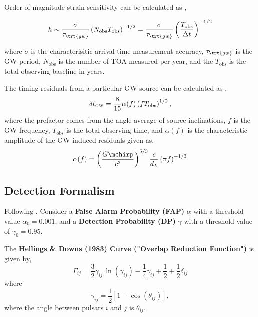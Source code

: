 \documentclass[10pt, oneside, onecolumn]{article}   	%
\newcommand{\tgw}{\tau_\trt{gw}}
\begin{document}
        Order of magnitude strain sensitivity can be calculated as \citep[][Eq.~21]{rajagopal1995},

        \begin{equation}
        h \sim \frac{\sigma}{\tgw} \left( N_\mathrm{obs} T_\mathrm{obs} \right)^{-1/2} = \frac{\sigma}{\tgw} \left( \frac{T_\mathrm{obs}}{\Delta t} \right)^{-1/2}
        \end{equation}

        where $\sigma$ is the characterisitic arrival time measurement accuracy, $\tgw$ is the GW period, $N_\mathrm{obs}$ is the number of TOA measured per-year, and the $T_\mathrm{obs}$ is the total observing baseline in years.

        The timing residuals from a particular GW source can be calculated as \citep[][Eq.~20]{sesana2009},
        \begin{equation}
        \delta t_\textrm{\tiny GW} = \frac{8}{15} \alpha(f) \left(f T_\textrm{obs}\right)^{1/2},
        \end{equation}
        where the prefactor comes from the angle average of source inclinations, $f$ is the GW frequency, $T_\textrm{obs}$ is the total observing time, and $\alpha(f)$ is the characteristic amplitude of the GW induced residuals given as,
        \begin{equation}
        \alpha(f) = \left(\frac{G \mchirp}{c^3}\right)^{5/3} \frac{c}{d_L} \left( \pi f \right)^{-1/3}
        \end{equation}

        \subsection{Detection Formalism}
        Following \citep{rosado2015}.  Consider a \textbf{False Alarm Probability (FAP)} $\alpha$ with a threshold value $\alpha_0 = 0.001$, and a \textbf{Detection Probability (DP)} $\gamma$ with a threshold value of $\gamma_0 = 0.95$.

        The \textbf{Hellings \& Downs (1983) Curve ("Overlap Reduction Function")} is given by,
        \begin{equation}
        \Gamma_{ij} = \frac{3}{2} \gamma_{ij} \, \ln \left(\gamma_{ij}\right) - \frac{1}{4}\gamma_{ij} + \frac{1}{2} + \frac{1}{2}\delta_{ij}
        \end{equation}
        where
        \begin{equation}
        \gamma_{ij} = \frac{1}{2}\left[1 - \cos(\theta_{ij})\right],
        \end{equation}
        where the angle between pulsars $i$ and $j$ is $\theta_{ij}$.
\end{document}
